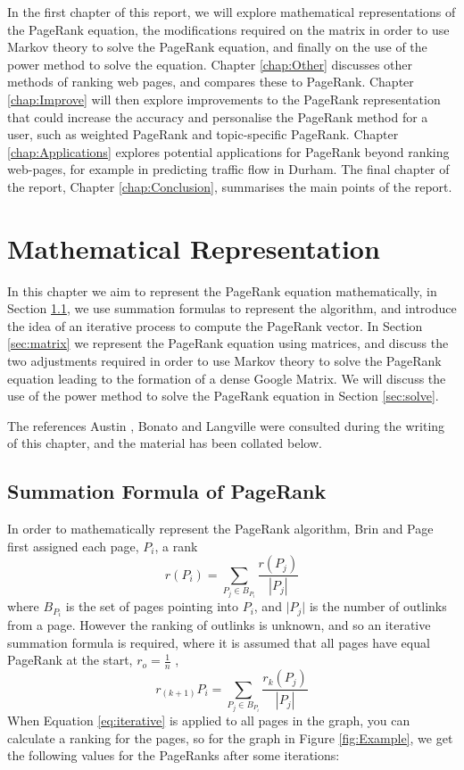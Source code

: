 \documentclass[11pt]{report}
\begin{document}
In the first chapter of this report, we will explore mathematical representations of the PageRank equation, the modifications required on the matrix in order to use Markov theory to solve the PageRank equation, and finally on the use of the power method to solve the equation. Chapter \ref{chap:Other} discusses other methods of ranking web pages, and compares these to PageRank. Chapter \ref{chap:Improve} will then explore improvements to the PageRank representation that could increase the accuracy and personalise the PageRank method for a user, such as weighted PageRank and topic-specific PageRank. Chapter \ref{chap:Applications} explores potential applications for PageRank beyond ranking web-pages, for example in predicting traffic flow in Durham. The final chapter of the report, Chapter \ref{chap:Conclusion}, summarises the main points of the report.

\chapter{Mathematical Representation} \label{chap:Math}
In this chapter we aim to represent the PageRank equation mathematically, in Section \ref{sec:summ}, we use summation formulas to represent the algorithm, and introduce the idea of an iterative process to compute the PageRank vector. In Section \ref{sec:matrix} we represent the PageRank equation using matrices, and discuss the two adjustments required in order to use Markov theory to solve the PageRank equation leading to the formation of a dense Google Matrix. We will discuss the use of the power method to solve the PageRank equation in Section \ref{sec:solve}.

The references Austin \cite{austin}, Bonato \cite{bonato} and Langville \cite{langville} were consulted during the writing of this chapter, and the material has been collated below.  
\section{Summation Formula of PageRank} \label{sec:summ}
In order to mathematically represent the PageRank algorithm, Brin and Page first assigned each page, $P_i$, a rank
\begin{equation}
r(P_i) = \displaystyle \sum_{P_j\in B_{P_i }} \frac{r(P_j)}{|P_j|}
\end{equation} where $B_{P_i}$ is the set of pages pointing into $P_i$, and $\vert P_j\vert$ is the number of outlinks from a page. However the ranking of outlinks is unknown, and so an iterative summation formula is required, where it is assumed that all pages have equal PageRank at the start, \(r_o = \frac{1}{n}\) , \begin{equation} \label{eq:iterative}
r_{(k+1)}P_i = \displaystyle \sum_{P_j\in B_{P_i }}\frac{r_k(P_j)}{|P_j|}
\end{equation} 
When Equation \eqref{eq:iterative} is applied to all pages in the graph, you can calculate a ranking for the pages, so for the graph in Figure \ref{fig:Example}, we get the following values for the PageRanks after some iterations: 
\end{document}
